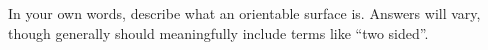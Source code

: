 {In your own words, describe what an orientable surface is.
}
{Answers will vary, though generally should meaningfully include terms like ``two sided''.
}
